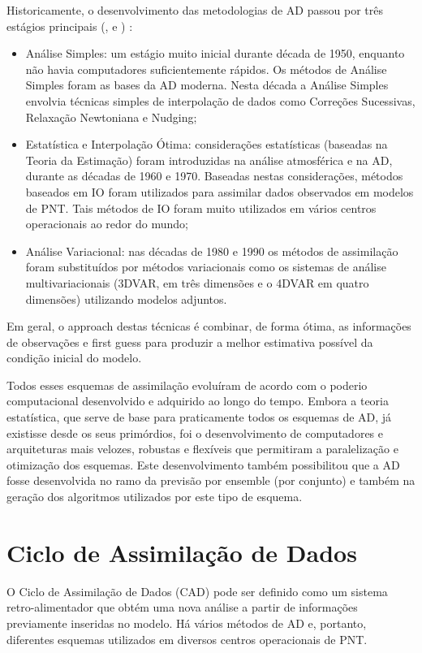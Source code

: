 Historicamente, o desenvolvimento das metodologias de AD passou por três estágios principais (\cite{wang2000}, e \cite{kalnay2003}) :

\begin{itemize}
\item Análise Simples: um estágio muito inicial durante década de 1950, enquanto não havia computadores suficientemente rápidos. Os métodos de Análise Simples foram as bases da AD moderna. Nesta década a Análise Simples envolvia técnicas simples de interpolação de dados como Correções Sucessivas, Relaxação Newtoniana e Nudging;
\item Estatística e Interpolação Ótima: considerações estatísticas (baseadas na Teoria da Estimação) foram introduzidas na análise atmosférica e na AD, durante as décadas de 1960 e 1970. Baseadas nestas considerações, métodos baseados em IO foram utilizados para assimilar dados observados em modelos de PNT. Tais métodos de IO foram muito utilizados em vários centros operacionais ao redor do mundo;
\item Análise Variacional: nas décadas de 1980 e 1990 os métodos de assimilação foram substituídos por métodos variacionais como os sistemas de análise multivariacionais (3DVAR, em três dimensões e o 4DVAR em quatro dimensões) utilizando modelos adjuntos. 
\end{itemize}

Em geral, o approach destas técnicas é combinar, de forma ótima, as informações de observações e first guess para produzir a melhor estimativa possível da condição inicial do modelo.

Todos esses esquemas de assimilação evoluíram de acordo com o poderio computacional desenvolvido e adquirido ao longo do tempo. Embora a teoria estatística, que serve de base para praticamente todos os esquemas de AD, já existisse desde os seus primórdios, foi o desenvolvimento de computadores e arquiteturas mais velozes, robustas e flexíveis que permitiram a paralelização e otimização dos esquemas. Este desenvolvimento também possibilitou que a AD fosse desenvolvida no ramo da previsão por ensemble (por conjunto) e também na geração dos algoritmos utilizados por este tipo de esquema.

\section{Ciclo de Assimilação de Dados}
\label{ss:cicloassimdados}

O Ciclo de Assimilação de Dados (CAD) pode ser definido como um sistema retro-alimentador que obtém uma nova análise a partir de informações previamente inseridas no modelo. Há vários métodos de AD e, portanto, diferentes esquemas utilizados em diversos centros operacionais de PNT.

